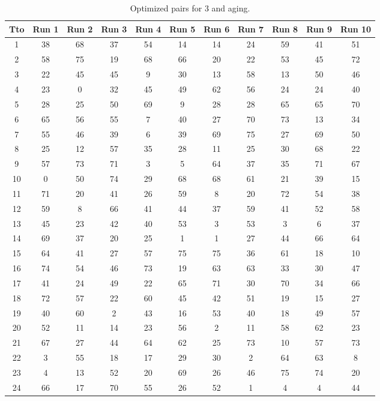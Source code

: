 \begin{table}
  \centering
  \scriptsize
  \caption{Optimized pairs for 3 and aging.}
  \label{tab_pairs}
\begin{tabular}{c c c c c c c c c c c }
\hline
Tto & Run 1 & Run 2 & Run 3 & Run 4 & Run 5 & Run 6 & Run 7 & Run 8 & Run 9 & Run 10 \\
\hline
1 & 38 & 68 & 37 & 54 & 14 & 14 & 24 & 59 & 41 & 51 \\
2 & 58 & 75 & 19 & 68 & 66 & 20 & 22 & 53 & 45 & 72 \\
3 & 22 & 45 & 45 & 9 & 30 & 13 & 58 & 13 & 50 & 46 \\
4 & 23 & 0 & 32 & 45 & 49 & 62 & 56 & 24 & 24 & 40 \\
5 & 28 & 25 & 50 & 69 & 9 & 28 & 28 & 65 & 65 & 70 \\
6 & 65 & 56 & 55 & 7 & 40 & 27 & 70 & 73 & 13 & 34 \\
7 & 55 & 46 & 39 & 6 & 39 & 69 & 75 & 27 & 69 & 50 \\
8 & 25 & 12 & 57 & 35 & 28 & 11 & 25 & 30 & 68 & 22 \\
9 & 57 & 73 & 71 & 3 & 5 & 64 & 37 & 35 & 71 & 67 \\
10 & 0 & 50 & 74 & 29 & 68 & 68 & 61 & 21 & 39 & 15 \\
11 & 71 & 20 & 41 & 26 & 59 & 8 & 20 & 72 & 54 & 38 \\
12 & 59 & 8 & 66 & 41 & 44 & 37 & 59 & 41 & 52 & 58 \\
13 & 45 & 23 & 42 & 40 & 53 & 3 & 53 & 3 & 6 & 37 \\
14 & 69 & 37 & 20 & 25 & 1 & 1 & 27 & 44 & 66 & 64 \\
15 & 64 & 41 & 27 & 57 & 75 & 75 & 36 & 61 & 18 & 10 \\
16 & 74 & 54 & 46 & 73 & 19 & 63 & 63 & 33 & 30 & 47 \\
17 & 41 & 24 & 49 & 22 & 65 & 71 & 30 & 70 & 34 & 66 \\
18 & 72 & 57 & 22 & 60 & 45 & 42 & 51 & 19 & 15 & 27 \\
19 & 40 & 60 & 2 & 43 & 16 & 53 & 40 & 18 & 49 & 57 \\
20 & 52 & 11 & 14 & 23 & 56 & 2 & 11 & 58 & 62 & 23 \\
21 & 67 & 27 & 44 & 64 & 62 & 25 & 73 & 10 & 57 & 73 \\
22 & 3 & 55 & 18 & 17 & 29 & 30 & 2 & 64 & 63 & 8 \\
23 & 4 & 13 & 52 & 20 & 69 & 26 & 46 & 75 & 74 & 20 \\
24 & 66 & 17 & 70 & 55 & 26 & 52 & 1 & 4 & 4 & 44 \\

\end{tabular}
\end{table}
